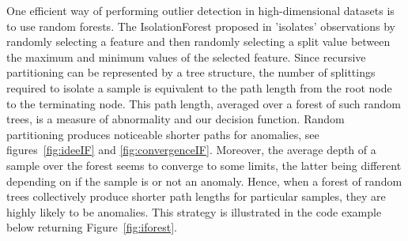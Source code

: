 One efficient way of performing outlier detection in high-dimensional datasets
is to use random forests.
%
The IsolationForest proposed in \cite{Liu2008} 'isolates' observations by randomly selecting a feature and then randomly selecting a split value between the maximum and minimum values of the selected feature.
%
Since recursive partitioning can be represented by a tree structure, the
number of splittings required to isolate a sample is equivalent to the path
length from the root node to the terminating node.
%
This path length, averaged over a forest of such random trees, is a measure
of abnormality and our decision function.
%
Random partitioning produces noticeable shorter paths for anomalies, see figures~\ref{fig:ideeIF} and \ref{fig:convergenceIF}. Moreover, the average depth of a sample over the forest seems to converge to some limits, the latter being different depending on if the sample is or not an anomaly.
Hence, when a forest of random trees collectively produce shorter path lengths
for particular samples, they are highly likely to be anomalies.
%
This strategy is illustrated in the code example below returning Figure~\ref{fig:iforest}.


